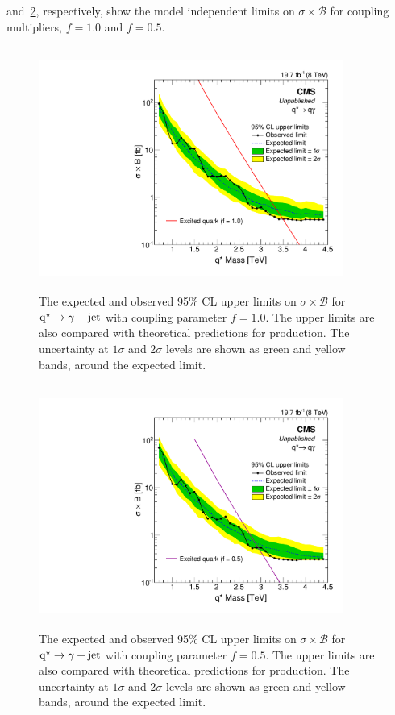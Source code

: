 \Figs{\ref{fig:qstarXSLimitfull}} and~\ref{fig:qstarXSLimithalf}, respectively, show the model independent limits on $\sigma\times\mathcal{B}$ for 
coupling multipliers, $f=1.0$ and $f=0.5$.
\begin{figure}[h!]
\centering
\includegraphics[width=10cm,height=8cm]{ch6/plots/ExcitedQuarksToGJ_f1p0_ObseExp_xs_Limits_fb.pdf}
 \caption{ The expected and observed 95\% CL upper limits on $\sigma\times\mathcal{B}$ for $\mathrm{q^\star}\to\gamma+\mathrm{jet}$ with coupling parameter $f=1.0$. The 
           upper limits are also compared with theoretical predictions for \qstar production. The uncertainty at $1\sigma$ and $2\sigma$ levels are
           shown as green and yellow bands, around the expected limit.}
\label{fig:qstarXSLimitfull}
\end{figure}
\begin{figure}[h!]
\centering
\includegraphics[width=10cm,height=8cm]{ch6/plots/ExcitedQuarksToGJ_f0p5_ObseExp_xs_Limits_fb.pdf}
 \caption{ The expected and observed 95\% CL upper limits on $\sigma\times\mathcal{B}$ for $\mathrm{q^\star}\to\gamma+\mathrm{jet}$ with coupling parameter $f=0.5$. The   
           upper limits are also compared with theoretical predictions for \qstar production. The uncertainty at $1\sigma$ and $2\sigma$ levels are 
           shown as green and yellow bands, around the expected limit.}
\label{fig:qstarXSLimithalf}
\end{figure}
